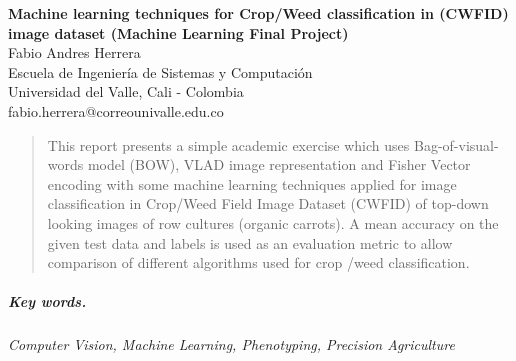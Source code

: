 \documentclass[12pt]{article}
\numberwithin{equation}{section}
\numberwithin{table}{section}
\numberwithin{figure}{section}
\begin{document}

\begin{center}

\textbf{\Large Machine learning techniques for Crop/Weed classification in (CWFID) image dataset \newline\newline(Machine Learning Final Project)} \\[6pt]

  Fabio Andres Herrera \\[6pt]
  Escuela de Ingeniería de Sistemas y Computación\\
  Universidad del Valle, Cali - Colombia  \\[6pt]
  fabio.herrera@correounivalle.edu.co
\end{center}

\begin{abstract}
\noindent	
This report presents a simple academic exercise which uses Bag-of-visual-words model (BOW), VLAD image representation and Fisher Vector encoding with some machine learning techniques applied for image classification in Crop/Weed Field Image Dataset (CWFID) of top-down looking images of row cultures (organic carrots). A  mean accuracy on the given test data and labels is used as an evaluation metric to allow comparison of different algorithms used for crop /weed classification.


\end{abstract}

\subparagraph{\textit{Key words.}}\textit{Computer Vision, Machine Learning, Phenotyping, Precision Agriculture}
\end{document}
